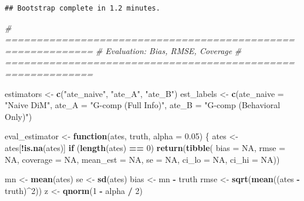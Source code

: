 \documentclass[
]{article}
\newenvironment{Shaded}{\begin{snugshade}}{\end{snugshade}}
\newcommand{\AttributeTok}[1]{\textcolor[rgb]{0.13,0.29,0.53}{#1}}
\newcommand{\CommentTok}[1]{\textcolor[rgb]{0.56,0.35,0.01}{\textit{#1}}}
\newcommand{\ConstantTok}[1]{\textcolor[rgb]{0.56,0.35,0.01}{#1}}
\newcommand{\ControlFlowTok}[1]{\textcolor[rgb]{0.13,0.29,0.53}{\textbf{#1}}}
\newcommand{\DecValTok}[1]{\textcolor[rgb]{0.00,0.00,0.81}{#1}}
\newcommand{\FloatTok}[1]{\textcolor[rgb]{0.00,0.00,0.81}{#1}}
\newcommand{\FunctionTok}[1]{\textcolor[rgb]{0.13,0.29,0.53}{\textbf{#1}}}
\newcommand{\NormalTok}[1]{#1}
\newcommand{\OtherTok}[1]{\textcolor[rgb]{0.56,0.35,0.01}{#1}}
\newcommand{\SpecialCharTok}[1]{\textcolor[rgb]{0.81,0.36,0.00}{\textbf{#1}}}
\newcommand{\StringTok}[1]{\textcolor[rgb]{0.31,0.60,0.02}{#1}}
\begin{document}
\begin{verbatim}
## Bootstrap complete in 1.2 minutes.
\end{verbatim}

\begin{Shaded}
\begin{Highlighting}[]
\CommentTok{\# ============================================================}
\CommentTok{\# Evaluation: Bias, RMSE, Coverage}
\CommentTok{\# ============================================================}

\NormalTok{estimators }\OtherTok{\textless{}{-}} \FunctionTok{c}\NormalTok{(}\StringTok{"ate\_naive"}\NormalTok{, }\StringTok{"ate\_A"}\NormalTok{, }\StringTok{"ate\_B"}\NormalTok{)}
\NormalTok{est\_labels }\OtherTok{\textless{}{-}} \FunctionTok{c}\NormalTok{(}\AttributeTok{ate\_naive =} \StringTok{"Naive DiM"}\NormalTok{,}
                \AttributeTok{ate\_A =} \StringTok{"G{-}comp (Full Info)"}\NormalTok{,}
                \AttributeTok{ate\_B =} \StringTok{"G{-}comp (Behavioral Only)"}\NormalTok{)}

\NormalTok{eval\_estimator }\OtherTok{\textless{}{-}} \ControlFlowTok{function}\NormalTok{(ates, truth, }\AttributeTok{alpha =} \FloatTok{0.05}\NormalTok{) \{}
\NormalTok{  ates }\OtherTok{\textless{}{-}}\NormalTok{ ates[}\SpecialCharTok{!}\FunctionTok{is.na}\NormalTok{(ates)]}
  \ControlFlowTok{if}\NormalTok{ (}\FunctionTok{length}\NormalTok{(ates) }\SpecialCharTok{==} \DecValTok{0}\NormalTok{) }\FunctionTok{return}\NormalTok{(}\FunctionTok{tibble}\NormalTok{(}
    \AttributeTok{bias =} \ConstantTok{NA}\NormalTok{, }\AttributeTok{rmse =} \ConstantTok{NA}\NormalTok{, }\AttributeTok{coverage =} \ConstantTok{NA}\NormalTok{,}
    \AttributeTok{mean\_est =} \ConstantTok{NA}\NormalTok{, }\AttributeTok{se =} \ConstantTok{NA}\NormalTok{, }\AttributeTok{ci\_lo =} \ConstantTok{NA}\NormalTok{, }\AttributeTok{ci\_hi =} \ConstantTok{NA}\NormalTok{))}

\NormalTok{  mn   }\OtherTok{\textless{}{-}} \FunctionTok{mean}\NormalTok{(ates)}
\NormalTok{  se   }\OtherTok{\textless{}{-}} \FunctionTok{sd}\NormalTok{(ates)}
\NormalTok{  bias }\OtherTok{\textless{}{-}}\NormalTok{ mn }\SpecialCharTok{{-}}\NormalTok{ truth}
\NormalTok{  rmse }\OtherTok{\textless{}{-}} \FunctionTok{sqrt}\NormalTok{(}\FunctionTok{mean}\NormalTok{((ates }\SpecialCharTok{{-}}\NormalTok{ truth)}\SpecialCharTok{\^{}}\DecValTok{2}\NormalTok{))}
\NormalTok{  z    }\OtherTok{\textless{}{-}} \FunctionTok{qnorm}\NormalTok{(}\DecValTok{1} \SpecialCharTok{{-}}\NormalTok{ alpha }\SpecialCharTok{/} \DecValTok{2}\NormalTok{)}


\end{Highlighting}
\end{Shaded}
\end{document}
